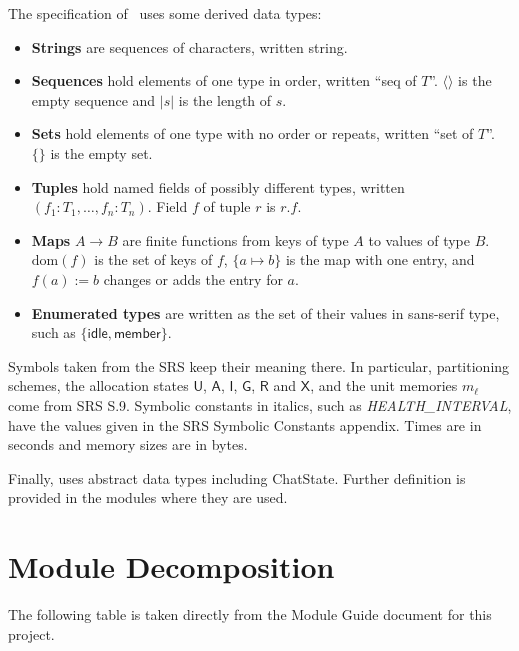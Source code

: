 \documentclass[12pt, titlepage]{article}
\begin{document}
\noindent
The specification of \progname \ uses some derived data types:
\begin{itemize}
  \item \textbf{Strings} are sequences of characters, written string.
  \item \textbf{Sequences} hold elements of one type in order, written
    ``seq of $T$''. $\langle\rangle$ is the empty sequence and $|s|$ is the
    length of $s$.
  \item \textbf{Sets} hold elements of one type with no order or repeats,
    written ``set of $T$''. $\{\}$ is the empty set.
  \item \textbf{Tuples} hold named fields of possibly different types, written
    $(f_1: T_1, \dots, f_n: T_n)$. Field $f$ of tuple $r$ is $r.f$.
  \item \textbf{Maps} $A \to B$ are finite functions from keys of type $A$ to
    values of type $B$. $\mathrm{dom}(f)$ is the set of keys of $f$,
    $\{a \mapsto b\}$ is the map with one entry, and $f(a) := b$ changes or adds
    the entry for $a$.
  \item \textbf{Enumerated types} are written as the set of their values in
    sans-serif type, such as $\{\mathsf{idle}, \mathsf{member}\}$.
\end{itemize}

\noindent
Symbols taken from the SRS keep their meaning there. In particular,
partitioning schemes, the allocation states $\mathsf{U}$, $\mathsf{A}$,
$\mathsf{I}$, $\mathsf{G}$, $\mathsf{R}$ and $\mathsf{X}$, and the unit
memories $m_\ell$ come from SRS S.9. Symbolic constants in italics, such as
\textit{HEALTH\_INTERVAL}, have the values given in the SRS Symbolic Constants
appendix. Times are in seconds and memory sizes are in bytes.

Finally, \progname{} uses abstract data types including ChatState. Further definition is provided
in the modules where they are used. 

\section{Module Decomposition}

The following table is taken directly from the Module Guide document for this project.
\end{document}
